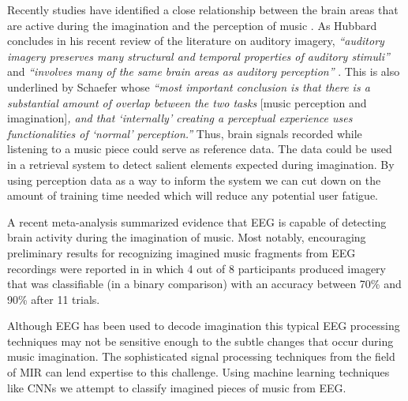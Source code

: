 Recently studies have identified a close relationship between the brain areas that are active during the imagination and the perception of music \cite{Halpern2004,Kraemer2005,Herholz2008,Herholz2012}.
As Hubbard concludes in his recent review of the literature on auditory imagery, \emph{``auditory imagery preserves many structural and temporal properties of auditory stimuli''} and \emph{``involves many of the same brain areas as auditory perception''} \cite{hubbard_auditory_2010}. 
This is also underlined by Schaefer \cite[p. 142]{schaefer_measuring_2011} whose \emph{``most important conclusion is that there is a substantial amount of overlap between the two tasks} [music perception and imagination]\emph{, and that `internally' creating a perceptual experience uses functionalities of `normal' perception.''}
Thus, brain signals recorded while listening to a music piece could serve as reference data. The data could be used in a retrieval system to detect salient elements expected during imagination.
By using perception data as a way to inform the system we can cut down on the amount of training time needed which will reduce any potential user fatigue.

A recent meta-analysis \cite{schaefer_shared_2013} summarized evidence that \ac{EEG} is capable of detecting brain activity during the imagination of music.
Most notably, encouraging preliminary results for recognizing imagined music fragments from \ac{EEG} recordings were reported in \cite{schaefer_single_2009} in which 4 out of 8 participants produced imagery that was classifiable (in a binary comparison) with an accuracy between 70\% and 90\% after 11 trials.%

Although \ac{EEG} has been used to decode imagination this typical EEG processing techniques may not be sensitive enough to the subtle changes that occur during music imagination. 
The sophisticated signal processing techniques from the field of \ac{MIR} can lend expertise to this challenge. 
Using machine learning techniques like \ac{CNN}s we attempt to classify imagined pieces of music from EEG. 


